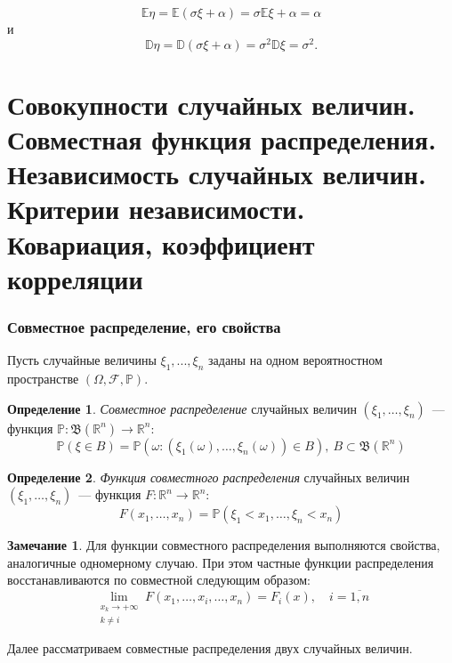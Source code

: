 \documentclass[oneside,final,14pt]{extreport}
\theoremstyle{plain}
\theoremstyle{definition}
\newtheorem*{defn}{Определение}
\newtheorem*{rmrk}{Замечание}
\theoremstyle{named}
\begin{document}
$$\mathbb{E}\eta = \mathbb{E}(\sigma \xi + \alpha) = \sigma \mathbb{E} \xi + \alpha = \alpha$$
и
$$\mathbb{D}\eta = \mathbb{D}(\sigma \xi + \alpha) = \sigma^2 \mathbb{D}\xi = \sigma^2.$$

\section{Совокупности случайных величин. Совместная функция распределения. Независимость случайных величин. Критерии независимости. Ковариация, коэффициент корреляции}

\subsubsection{Совместное распределение, его свойства}

Пусть случайные величины $\xi_1, ..., \xi_n$ заданы на одном вероятностном пространстве $(\Omega, \mathcal{F}, \mathbb{P})$.
\begin{defn}
    {\it Совместное распределение} случайных величин $(\xi_1, \ldots, \xi_n)$~--- функция $\mathbb{P}: \mathfrak{B}(\mathbb{R}^{n}) \to \mathbb{R}^{n}$:
    \begin{equation*}
        \mathbb{P}(\xi \in B) = \mathbb{P}(\omega: (\xi_{1}(\omega), \ldots, \xi_{n}(\omega)) \in B),~ B \subset \mathfrak{B}(\mathbb{R}^{n})
    \end{equation*}
\end{defn}
\begin{defn}
    {\it Функция совместного распределения} случайных величин $(\xi_1, \ldots, \xi_n)$~--- функция $F: \mathbb{R}^{n} \to \mathbb{R}^{n}$:
    \begin{equation*}
        F(x_{1}, \ldots, x_{n})=\mathbb{P}(\xi_{1}<x_{1}, \ldots, \xi_{n}<x_{n})
    \end{equation*}
\end{defn}

\begin{rmrk}
    Для функции совместного распределения выполняются свойства, аналогичные одномерному случаю. При этом частные функции распределения восстанавливаются по совместной следующим образом:
    \begin{equation*}
        \lim_{\substack{x_{k} \to +\infty \\ k \neq i}}  F(x_{1}, \ldots, x_{i}, \ldots, x_{n}) = F_{i}(x), \quad i = \overline{1,n}
    \end{equation*}
\end{rmrk}
Далее рассматриваем совместные распределения двух случайных величин.
\end{document}
